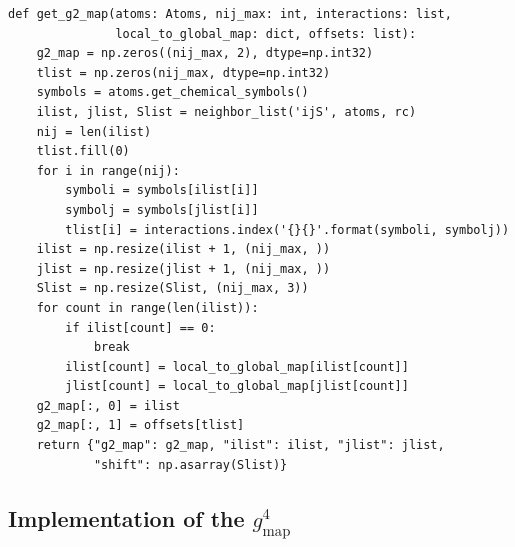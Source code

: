 \documentclass[preprint]{revtex4-2}
\begin{document}
{\begin{verbatim}
def get_g2_map(atoms: Atoms, nij_max: int, interactions: list, 
               local_to_global_map: dict, offsets: list):
    g2_map = np.zeros((nij_max, 2), dtype=np.int32)
    tlist = np.zeros(nij_max, dtype=np.int32)
    symbols = atoms.get_chemical_symbols()
    ilist, jlist, Slist = neighbor_list('ijS', atoms, rc)
    nij = len(ilist)
    tlist.fill(0)
    for i in range(nij):
        symboli = symbols[ilist[i]]
        symbolj = symbols[jlist[i]]
        tlist[i] = interactions.index('{}{}'.format(symboli, symbolj))
    ilist = np.resize(ilist + 1, (nij_max, ))
    jlist = np.resize(jlist + 1, (nij_max, ))
    Slist = np.resize(Slist, (nij_max, 3))
    for count in range(len(ilist)):
        if ilist[count] == 0:
            break
        ilist[count] = local_to_global_map[ilist[count]]
        jlist[count] = local_to_global_map[jlist[count]]
    g2_map[:, 0] = ilist
    g2_map[:, 1] = offsets[tlist]
    return {"g2_map": g2_map, "ilist": ilist, "jlist": jlist, 
            "shift": np.asarray(Slist)}
\end{verbatim}

\newpage

\subsection{Implementation of the $g^4_{\mathrm{map}}$}

}
\end{document}
